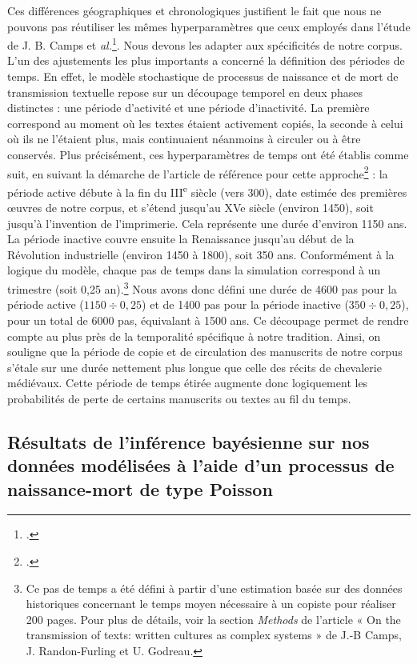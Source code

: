 \documentclass[a4paper,twoside,12pt]{book}
\begin{document}
Ces différences géographiques et chronologiques justifient le fait que nous ne pouvons pas réutiliser les mêmes hyperparamètres que ceux employés dans l'étude de J. B. Camps et \textit{al.}\footcite{camps_transmission_2025}. Nous devons les adapter aux spécificités de notre corpus. L’un des ajustements les plus importants a concerné la définition des périodes de temps. En effet, le modèle stochastique de processus de naissance et de mort de transmission textuelle repose sur un découpage temporel en  deux phases distinctes : une période d’activité et une période d’inactivité. La première correspond au moment où les textes étaient activement copiés, la seconde à celui où ils ne l’étaient plus, mais continuaient néanmoins à circuler ou à être conservés. Plus précisément, ces hyperparamètres de temps ont été établis comme suit, en suivant la démarche de l'article de référence pour cette approche\footcite{camps_transmission_2025} : la période active débute à la fin du III\textsuperscript{e} siècle (vers 300), date estimée des premières œuvres de notre corpus, et s’étend jusqu’au XVe siècle (environ 1450), soit jusqu’à l’invention de l’imprimerie. Cela représente une durée d’environ 1150 ans. La période inactive couvre ensuite la Renaissance jusqu’au début de la Révolution industrielle (environ 1450 à 1800), soit 350 ans.
Conformément à la logique du modèle, chaque pas de temps dans la simulation correspond à un trimestre (soit 0{,}25 an).\footnote{Ce pas de temps a été défini à partir d’une estimation basée sur des données historiques concernant le temps moyen nécessaire à un copiste pour réaliser 200 pages. Pour plus de détails, voir la section \textit{Methods} de l’article « On the transmission of texts: written cultures as complex systems » de J.-B Camps, J. Randon-Furling et U. Godreau.
} Nous avons donc défini une durée de 4600 pas pour la période active ($1150 \div 0{,}25$) et de 1400 pas pour la période inactive ($350 \div 0{,}25$), pour un total de 6000 pas, équivalant à 1500 ans. Ce découpage permet de rendre compte au plus près de la temporalité spécifique à notre tradition. Ainsi, on souligne que la période de copie et de circulation des manuscrits de notre corpus s’étale sur une durée nettement plus longue que celle des récits de chevalerie médiévaux. Cette période de temps étirée augmente donc logiquement les probabilités de perte de certains manuscrits ou textes au fil du temps. 

\subsection{Résultats de l'inférence bayésienne sur nos données modélisées à l’aide d’un processus de naissance-mort de type Poisson}
\end{document}
